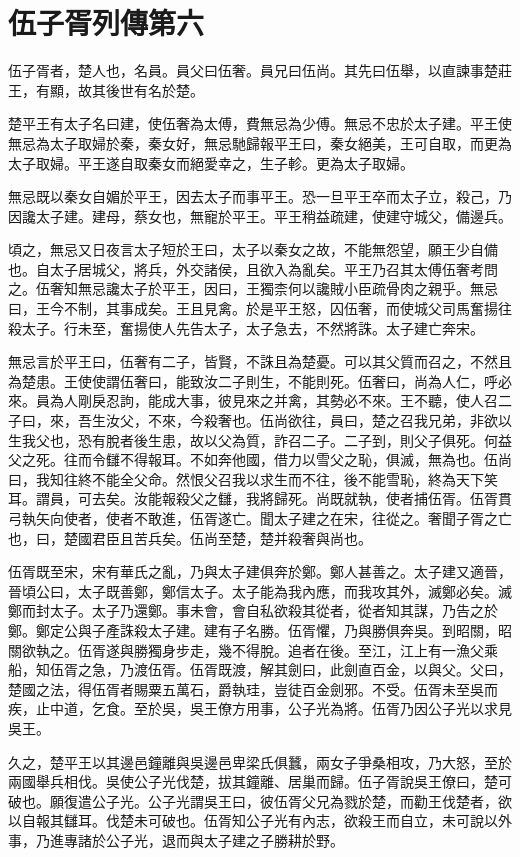 \chapter{伍子胥列傳第六}

伍子胥者，楚人也，名員。員父曰伍奢。員兄曰伍尚。其先曰伍舉，以直諫事楚莊王，有顯，故其後世有名於楚。

楚平王有太子名曰建，使伍奢為太傅，費無忌為少傅。無忌不忠於太子建。平王使無忌為太子取婦於秦，秦女好，無忌馳歸報平王曰，秦女絕美，王可自取，而更為太子取婦。平王遂自取秦女而絕愛幸之，生子軫。更為太子取婦。

無忌既以秦女自媚於平王，因去太子而事平王。恐一旦平王卒而太子立，殺己，乃因讒太子建。建母，蔡女也，無寵於平王。平王稍益疏建，使建守城父，備邊兵。

頃之，無忌又日夜言太子短於王曰，太子以秦女之故，不能無怨望，願王少自備也。自太子居城父，將兵，外交諸侯，且欲入為亂矣。平王乃召其太傅伍奢考問之。伍奢知無忌讒太子於平王，因曰，王獨柰何以讒賊小臣疏骨肉之親乎。無忌曰，王今不制，其事成矣。王且見禽。於是平王怒，囚伍奢，而使城父司馬奮揚往殺太子。行未至，奮揚使人先告太子，太子急去，不然將誅。太子建亡奔宋。

無忌言於平王曰，伍奢有二子，皆賢，不誅且為楚憂。可以其父質而召之，不然且為楚患。王使使謂伍奢曰，能致汝二子則生，不能則死。伍奢曰，尚為人仁，呼必來。員為人剛戾忍訽，能成大事，彼見來之并禽，其勢必不來。王不聽，使人召二子曰，來，吾生汝父，不來，今殺奢也。伍尚欲往，員曰，楚之召我兄弟，非欲以生我父也，恐有脫者後生患，故以父為質，詐召二子。二子到，則父子俱死。何益父之死。往而令讎不得報耳。不如奔他國，借力以雪父之恥，俱滅，無為也。伍尚曰，我知往終不能全父命。然恨父召我以求生而不往，後不能雪恥，終為天下笑耳。謂員，可去矣。汝能報殺父之讎，我將歸死。尚既就執，使者捕伍胥。伍胥貫弓執矢向使者，使者不敢進，伍胥遂亡。聞太子建之在宋，往從之。奢聞子胥之亡也，曰，楚國君臣且苦兵矣。伍尚至楚，楚并殺奢與尚也。

伍胥既至宋，宋有華氏之亂，乃與太子建俱奔於鄭。鄭人甚善之。太子建又適晉，晉頃公曰，太子既善鄭，鄭信太子。太子能為我內應，而我攻其外，滅鄭必矣。滅鄭而封太子。太子乃還鄭。事未會，會自私欲殺其從者，從者知其謀，乃告之於鄭。鄭定公與子產誅殺太子建。建有子名勝。伍胥懼，乃與勝俱奔吳。到昭關，昭關欲執之。伍胥遂與勝獨身步走，幾不得脫。追者在後。至江，江上有一漁父乘船，知伍胥之急，乃渡伍胥。伍胥既渡，解其劍曰，此劍直百金，以與父。父曰，楚國之法，得伍胥者賜粟五萬石，爵執珪，豈徒百金劍邪。不受。伍胥未至吳而疾，止中道，乞食。至於吳，吳王僚方用事，公子光為將。伍胥乃因公子光以求見吳王。

久之，楚平王以其邊邑鐘離與吳邊邑卑梁氏俱蠶，兩女子爭桑相攻，乃大怒，至於兩國舉兵相伐。吳使公子光伐楚，拔其鐘離、居巢而歸。伍子胥說吳王僚曰，楚可破也。願復遣公子光。公子光謂吳王曰，彼伍胥父兄為戮於楚，而勸王伐楚者，欲以自報其讎耳。伐楚未可破也。伍胥知公子光有內志，欲殺王而自立，未可說以外事，乃進專諸於公子光，退而與太子建之子勝耕於野。


